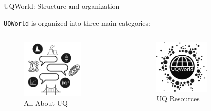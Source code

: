 \documentclass[]{rsuqbeamernew}
\begin{document}
\begin{frame}[t]{UQWorld: Structure and organization}
  
\texttt{UQWorld} is organized into three main categories:
\begin{columns}
  \begin{figure}
    \includegraphics[width=0.70\textwidth]{../figures/all-about-uq_512}
    \caption*{All About UQ}
  \end{figure}
  
  \begin{figure}
    \includegraphics[width=0.65\textwidth]{../figures/uq-resources_512}
    \caption*{UQ Resources}
  \end{figure}
  

\end{columns}
\end{frame}
\end{document}
